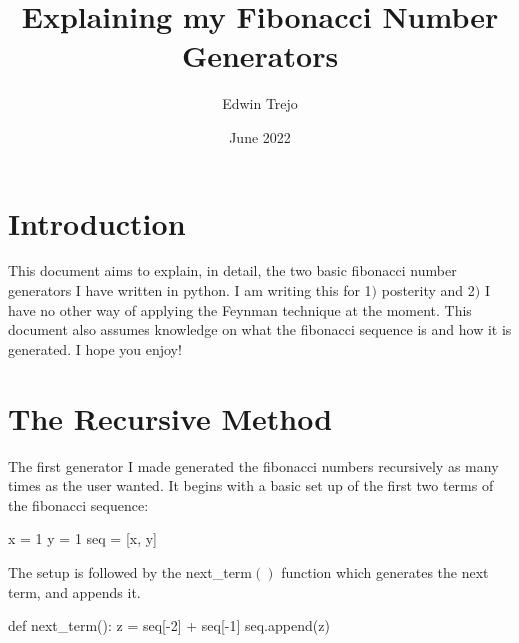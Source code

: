 \documentclass{article}
\title{Explaining my Fibonacci Number Generators}
\author{Edwin Trejo}
\date{June 2022}
\begin{document}
\maketitle

\section{Introduction}

    This document aims to explain, in detail, the two basic fibonacci number generators I have written in python.
I am writing this for 1\()\) posterity and 2\()\) I have no other way of applying the Feynman technique at the moment. 
This document also assumes knowledge on what the fibonacci sequence is and how it is generated. I hope you enjoy!

\section{The Recursive Method}

The first generator I made generated the fibonacci numbers recursively as many times as the user wanted.
It begins with a basic set up of the first two terms of the fibonacci sequence:
\begin{verbatim*}
x = 1
y = 1
seq = [x, y]
\end{verbatim*}

The setup is followed by the next_term\(()\) function which generates the next term, and appends it. 

\begin{verbatim*}
    def next_term():
    z = seq[-2] + seq[-1]
    seq.append(z)
\end{verbatim*}
\end{document}
